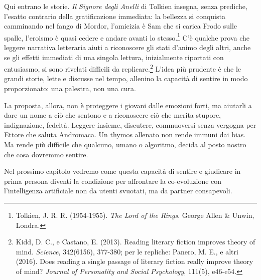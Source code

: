Qui entrano le storie. \textit{Il Signore degli Anelli} di Tolkien insegna, senza prediche, l'esatto contrario della gratificazione immediata: la bellezza si conquista camminando nel fango di Mordor, l'amicizia è Sam che si carica Frodo sulle spalle, l'eroismo è quasi cedere e andare avanti lo stesso.\footnote{Tolkien, J. R. R. (1954-1955). \textit{The Lord of the Rings}. George Allen \& Unwin, Londra.} C'è qualche prova che leggere narrativa letteraria aiuti a riconoscere gli stati d'animo degli altri, anche se gli effetti immediati di una singola lettura, inizialmente riportati con entusiasmo, si sono rivelati difficili da replicare.\footnote{Kidd, D. C., e Castano, E. (2013). Reading literary fiction improves theory of mind. \textit{Science}, 342(6156), 377-380; per le repliche: Panero, M. E., e altri (2016). Does reading a single passage of literary fiction really improve theory of mind? \textit{Journal of Personality and Social Psychology}, 111(5), e46-e54.} L'idea più prudente è che le grandi storie, lette e discusse nel tempo, allenino la capacità di sentire in modo proporzionato: una palestra, non una cura.

La proposta, allora, non è proteggere i giovani dalle emozioni forti, ma aiutarli a dare un nome a ciò che sentono e a riconoscere ciò che merita stupore, indignazione, fedeltà. Leggere insieme, discutere, commuoversi senza vergogna per Ettore che saluta Andromaca. Un thymos allenato non rende immuni dai bias. Ma rende più difficile che qualcuno, umano o algoritmo, decida al posto nostro che cosa dovremmo sentire.

\bigskip

Nel prossimo capitolo vedremo come questa capacità di sentire e giudicare in prima persona diventi la condizione per affrontare la co-evoluzione con l'intelligenza artificiale non da utenti svuotati, ma da partner consapevoli.

